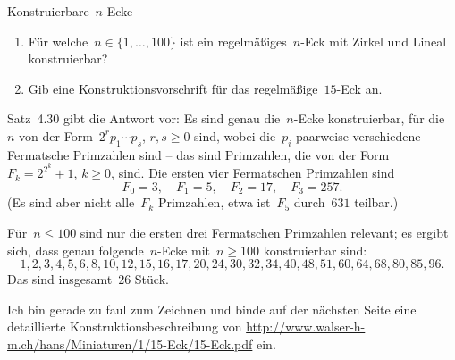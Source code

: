 \documentclass{algblatt}
\begin{document}
\vspace*{-1.5cm}

\begin{aufgabe}{Konstruierbare~$n$-Ecke}
\begin{enumerate}
\item Für welche~$n \in \{ 1,\ldots,100 \}$ ist ein regelmäßiges~$n$-Eck
mit Zirkel und Lineal konstruierbar?
\item Gib eine Konstruktionsvorschrift für das regelmäßige~$15$-Eck an.
\end{enumerate}

\begin{loesungE}
\item Satz~4.30 gibt die Antwort vor: Es sind genau die~$n$-Ecke konstruierbar,
für die~$n$ von der Form~$2^r p_1 \cdots p_s$, $r,s \geq 0$ sind, wobei
die~$p_i$ paarweise verschiedene Fermatsche Primzahlen sind -- das sind
Primzahlen, die von der Form~$F_k = 2^{2^k} + 1$, $k \geq 0$, sind. Die ersten
vier Fermatschen Primzahlen sind
\[ F_0 = 3,\quad
  F_1 = 5,\quad
  F_2 = 17,\quad
  F_3 = 257. \]
(Es sind aber nicht alle~$F_k$ Primzahlen, etwa ist~$F_5$ durch~$631$ teilbar.)

Für~$n \leq 100$ sind nur die ersten drei Fermatschen Primzahlen relevant; es
ergibt sich, dass genau folgende~$n$-Ecke mit~$n \geq 100$ konstruierbar
sind:
\[ 1,2,3,4,5,6,8,10,12,15,16,17,20,24,30,32,34,40,48,51,60,64,68,80,85,96. \]
Das sind insgesamt~26 Stück.

\item Ich bin gerade zu faul zum Zeichnen und binde auf der nächsten Seite eine
detaillierte Konstruktionsbeschreibung von
\url{http://www.walser-h-m.ch/hans/Miniaturen/1/15-Eck/15-Eck.pdf} ein.
\end{loesungE}
\end{aufgabe}
\ifloesungen

\fi
\end{document}

